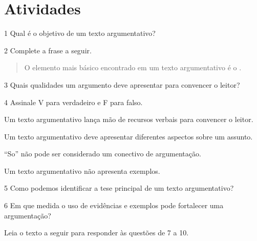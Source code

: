 \pagebreak
\section*{Atividades}

\num{1} Qual é o objetivo de um texto argumentativo?



\num{2} Complete a frase a seguir.

\begin{quote}
O elemento mais básico encontrado em um texto argumentativo é o .
\end{quote}

\num{3} Quais qualidades um argumento deve apresentar para convencer o leitor?


\num{4} Assinale V para verdadeiro e F para falso.

\begin{boxlist}
 Um texto argumentativo lança mão de recursos verbais para convencer o leitor.

 Um texto argumentativo deve apresentar diferentes aspectos sobre um assunto.

 ``So'' não pode ser considerado um conectivo de argumentação.

 Um texto argumentativo não apresenta exemplos.
\end{boxlist}

\num{5} Como podemos identificar a tese principal de um texto argumentativo?


\num{6} Em que medida o uso de evidências e exemplos pode fortalecer uma argumentação?



Leia o texto a seguir para responder às questões de 7 a 10.

